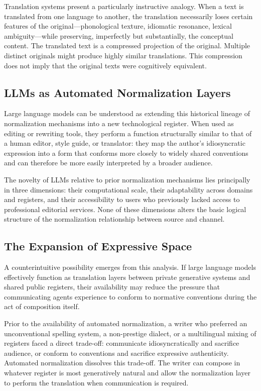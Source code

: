 \documentclass[12pt,a4paper]{article}
\theoremstyle{definition}
\theoremstyle{plain}
\theoremstyle{remark}
\begin{document}
Translation systems present a particularly instructive analogy. When a text is translated
from one language to another, the translation necessarily loses certain features of the
original---phonological texture, idiomatic resonance, lexical ambiguity---while preserving,
imperfectly but substantially, the conceptual content. The translated text is a compressed
projection of the original. Multiple distinct originals might produce highly similar
translations. This compression does not imply that the original texts were cognitively
equivalent.

\subsection{LLMs as Automated Normalization Layers}

Large language models can be understood as extending this historical lineage of normalization
mechanisms into a new technological register. When used as editing or rewriting tools, they
perform a function structurally similar to that of a human editor, style guide, or translator:
they map the author's idiosyncratic expression into a form that conforms more closely to
widely shared conventions and can therefore be more easily interpreted by a broader audience.

The novelty of LLMs relative to prior normalization mechanisms lies principally in three
dimensions: their computational scale, their adaptability across domains and registers, and
their accessibility to users who previously lacked access to professional editorial services.
None of these dimensions alters the basic logical structure of the normalization relationship
between source and channel.

\subsection{The Expansion of Expressive Space}

A counterintuitive possibility emerges from this analysis. If large language models
effectively function as translation layers between private generative systems and shared
public registers, their availability may reduce the pressure that communicating agents
experience to conform to normative conventions during the act of composition itself.

Prior to the availability of automated normalization, a writer who preferred an unconventional
spelling system, a non-prestige dialect, or a multilingual mixing of registers faced a direct
trade-off: communicate idiosyncratically and sacrifice audience, or conform to conventions
and sacrifice expressive authenticity. Automated normalization dissolves this trade-off. The
writer can compose in whatever register is most generatively natural and allow the normalization
layer to perform the translation when communication is required.
\end{document}
